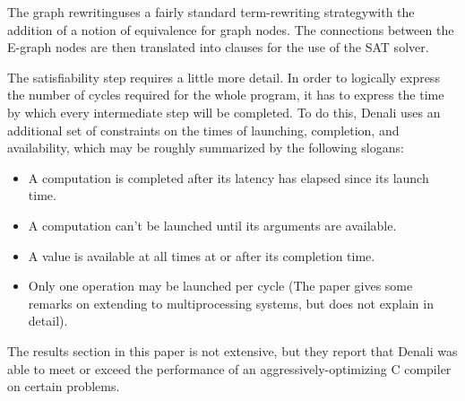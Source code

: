 \documentclass[12pt,twoside]{reedthesis}
\newcommand{\comment}[2]{\textbf{#1} \textcolor{blue}{#2}}
\begin{document}
            The graph rewriting\footnotemark uses a fairly standard term-rewriting strategy\footnotemark with the addition of a notion of equivalence for graph nodes.
            The connections between the E-graph nodes are then translated into clauses for the use of the SAT solver.


            \footnotetext{
            \comment{graph rewriting}{introduce graph rewriting}
            }
                
                
            The satisfiability step requires a little more detail.
            In order to logically express the number of cycles required for the whole program, it has to express the time by which every intermediate step will be completed.
            To do this, Denali uses an additional set of constraints on the times of launching, completion, and availability, which may be roughly summarized by the following slogans:
            \begin{itemize}
                \item A computation is completed after its latency has elapsed since its launch time.
                \item A computation can't be launched until its arguments are available.
                \item A value is available at all times at or after its completion time.
                \item Only one operation may be launched per cycle (The paper gives some remarks on extending to multiprocessing systems, but does not explain in detail).
            \end{itemize}
                
            The results section in this paper is not extensive, but they report that Denali was able to meet or exceed the performance of an aggressively-optimizing C compiler on certain problems.
\end{document}
